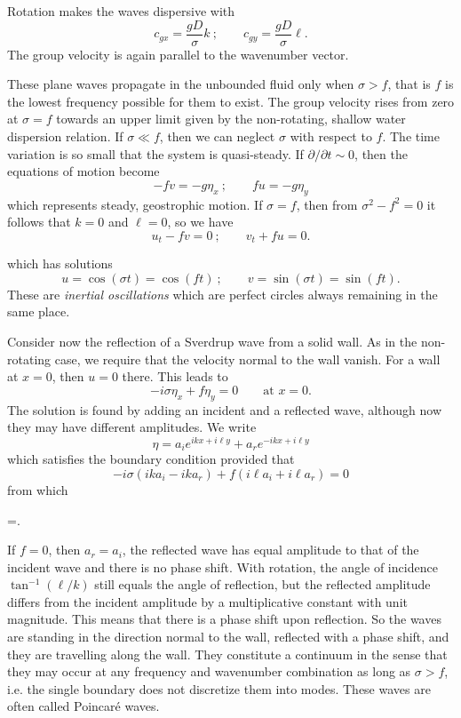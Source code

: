 
\wavefiguremark

Rotation makes the waves dispersive with
\[
	c_{gx}=\frac{gD}{\sigma}k
	\ ;\qquad
	c_{gy}=\frac{gD}{\sigma}\ell.
\]
The group velocity is again parallel to the wavenumber vector.

These plane waves propagate in the unbounded fluid only when $\sigma>f$, that is $f$
is the lowest frequency possible for them to exist. The group velocity rises from zero
at $\sigma=f$ towards an upper limit given by the non-rotating, shallow water
dispersion relation. If $\sigma\ll f$, then we can neglect $\sigma$ with respect to $f$.
The time variation is so small that the system is quasi-steady. If
$\partial/\partial t\sim0$, then the equations of motion become
\[
	-fv=-g\eta_x
	\ ;\qquad
	fu=-g\eta_y
\]
which represents steady, geostrophic motion. If $\sigma=f$, then from
$\sigma^2-f^2=0$ it follows that $k=0$ and $\ell=0$, so we have
\[
	u_t-fv=0
	\ ;\qquad
	v_t+fu=0.
\]

\sourcepagebreak

which has solutions
\[
	u=\cos(\sigma t)=\cos(ft)
	\ ;\qquad
	v=\sin(\sigma t)=\sin(ft).
\]
These are \emph{inertial oscillations} which are perfect circles always remaining in the
same place.

Consider now the reflection of a Sverdrup wave from a solid wall. As in the
non-rotating case, we require that the velocity normal to the wall vanish. For a wall
at $x=0$, then $u=0$ there. This leads to
\[
	-i\sigma\eta_x+f\eta_y=0
	\qquad\text{at }x=0.
\]
The solution is found by adding an incident and a reflected wave, although now they
may have different amplitudes. We write
\[
	\eta=a_i e^{ikx+i\ell y}+a_r e^{-ikx+i\ell y}
\]
which satisfies the boundary condition provided that
\[
	-i\sigma(ika_i-ika_r)+f(i\ell a_i+i\ell a_r)=0
\]
from which
\begin{waveequation}
	=.
\end{waveequation}

If $f=0$, then $a_r=a_i$, the reflected wave has equal amplitude to that of the
incident wave and there is no phase shift. With rotation, the angle of incidence
$\tan^{-1}(\ell/k)$ still equals the angle of reflection, but the reflected amplitude
differs from the incident amplitude by a multiplicative constant with unit magnitude.
This means that there is a phase shift upon reflection. So the waves are standing in
the direction normal to the wall, reflected with a phase shift, and they are travelling
along the wall. They constitute a continuum in the sense that they may occur at any
frequency and wavenumber combination as long as $\sigma>f$, i.e. the single boundary
does not discretize them into modes. These waves are often called Poincaré waves.

